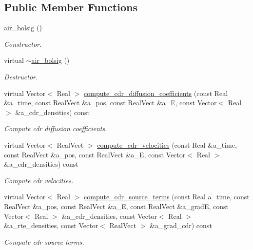 \subsection*{Public Member Functions}
\begin{DoxyCompactItemize}
\item 
\hyperlink{classair__bolsig_a8a97eebd7860fb9016fb89bbe0442d59}{air\+\_\+bolsig} ()
\begin{DoxyCompactList}\small\item\em Constructor. \end{DoxyCompactList}\item 
virtual \hyperlink{classair__bolsig_aeb45bc1a6683c52fa016b98e930d19a9}{$\sim$air\+\_\+bolsig} ()
\begin{DoxyCompactList}\small\item\em Destructor. \end{DoxyCompactList}\item 
virtual Vector$<$ Real $>$ \hyperlink{classair__bolsig_a3c62c36d67f4d59cdc6369dbf2cce42a}{compute\+\_\+cdr\+\_\+diffusion\+\_\+coefficients} (const Real \&a\+\_\+time, const Real\+Vect \&a\+\_\+pos, const Real\+Vect \&a\+\_\+E, const Vector$<$ Real $>$ \&a\+\_\+cdr\+\_\+densities) const 
\begin{DoxyCompactList}\small\item\em Compute cdr diffusion coefficients. \end{DoxyCompactList}\item 
virtual Vector$<$ Real\+Vect $>$ \hyperlink{classair__bolsig_a85b8c05ef5eec426f3e2941829e47a12}{compute\+\_\+cdr\+\_\+velocities} (const Real \&a\+\_\+time, const Real\+Vect \&a\+\_\+pos, const Real\+Vect \&a\+\_\+E, const Vector$<$ Real $>$ \&a\+\_\+cdr\+\_\+densities) const 
\begin{DoxyCompactList}\small\item\em Compute cdr velocities. \end{DoxyCompactList}\item 
virtual Vector$<$ Real $>$ \hyperlink{classair__bolsig_ab337f396998a9bf47a55220437b30e72}{compute\+\_\+cdr\+\_\+source\+\_\+terms} (const Real a\+\_\+time, const Real\+Vect \&a\+\_\+pos, const Real\+Vect \&a\+\_\+E, const Real\+Vect \&a\+\_\+gradE, const Vector$<$ Real $>$ \&a\+\_\+cdr\+\_\+densities, const Vector$<$ Real $>$ \&a\+\_\+rte\+\_\+densities, const Vector$<$ Real\+Vect $>$ \&a\+\_\+grad\+\_\+cdr) const 
\begin{DoxyCompactList}\small\item\em Compute cdr source terms. \end{DoxyCompactList}\item 

\end{DoxyCompactItemize}
